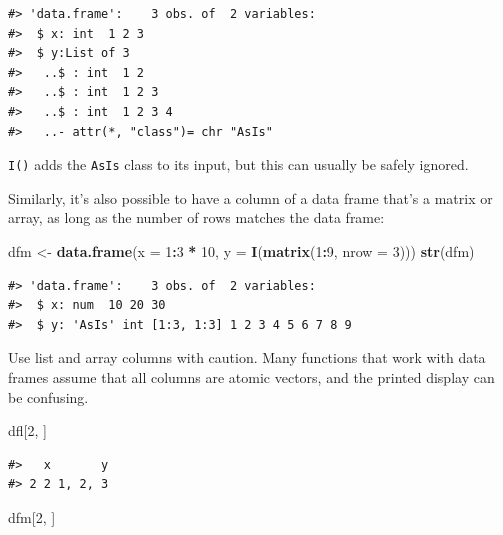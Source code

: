 \documentclass[]{book}
\newenvironment{Shaded}{\begin{snugshade}}{\end{snugshade}}
\newcommand{\KeywordTok}[1]{\textcolor[rgb]{0.13,0.29,0.53}{\textbf{#1}}}
\newcommand{\DataTypeTok}[1]{\textcolor[rgb]{0.13,0.29,0.53}{#1}}
\newcommand{\DecValTok}[1]{\textcolor[rgb]{0.00,0.00,0.81}{#1}}
\newcommand{\StringTok}[1]{\textcolor[rgb]{0.31,0.60,0.02}{#1}}
\newcommand{\OperatorTok}[1]{\textcolor[rgb]{0.81,0.36,0.00}{\textbf{#1}}}
\newcommand{\NormalTok}[1]{#1}
\theoremstyle{definition}
\theoremstyle{definition}
\theoremstyle{definition}
\theoremstyle{remark}
\begin{document}
\begin{verbatim}
#> 'data.frame':    3 obs. of  2 variables:
#>  $ x: int  1 2 3
#>  $ y:List of 3
#>   ..$ : int  1 2
#>   ..$ : int  1 2 3
#>   ..$ : int  1 2 3 4
#>   ..- attr(*, "class")= chr "AsIs"
\end{verbatim}

\texttt{I()} adds the \texttt{AsIs} class to its input, but this can
usually be safely ignored.

Similarly, it's also possible to have a column of a data frame that's a
matrix or array, as long as the number of rows matches the data frame:

\begin{Shaded}
\begin{Highlighting}[]
\NormalTok{dfm <-}\StringTok{ }\KeywordTok{data.frame}\NormalTok{(}\DataTypeTok{x =} \DecValTok{1}\OperatorTok{:}\DecValTok{3} \OperatorTok{*}\StringTok{ }\DecValTok{10}\NormalTok{, }\DataTypeTok{y =} \KeywordTok{I}\NormalTok{(}\KeywordTok{matrix}\NormalTok{(}\DecValTok{1}\OperatorTok{:}\DecValTok{9}\NormalTok{, }\DataTypeTok{nrow =} \DecValTok{3}\NormalTok{)))}
\KeywordTok{str}\NormalTok{(dfm)}
\end{Highlighting}
\end{Shaded}

\begin{verbatim}
#> 'data.frame':    3 obs. of  2 variables:
#>  $ x: num  10 20 30
#>  $ y: 'AsIs' int [1:3, 1:3] 1 2 3 4 5 6 7 8 9
\end{verbatim}

Use list and array columns with caution. Many functions that work with
data frames assume that all columns are atomic vectors, and the printed
display can be confusing.

\begin{Shaded}
\begin{Highlighting}[]
\NormalTok{dfl[}\DecValTok{2}\NormalTok{, ]}
\end{Highlighting}
\end{Shaded}

\begin{verbatim}
#>   x       y
#> 2 2 1, 2, 3
\end{verbatim}

\begin{Shaded}
\begin{Highlighting}[]
\NormalTok{dfm[}\DecValTok{2}\NormalTok{, ]}
\end{Highlighting}
\end{Shaded}
\end{document}

